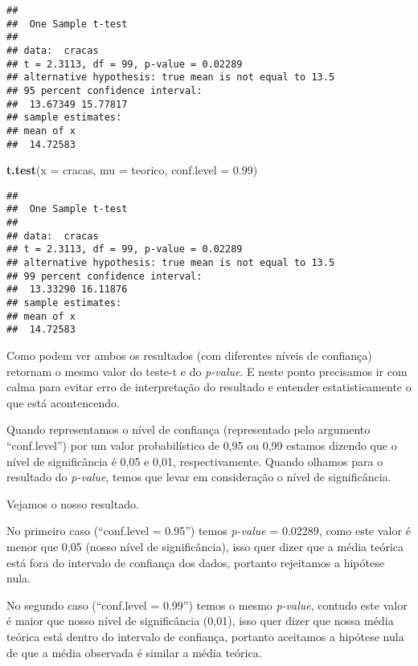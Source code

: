 \documentclass[titlepage, oneside, openany, a4paper]{book}
\newenvironment{Shaded}{\begin{snugshade}}{\end{snugshade}}
\newcommand{\DataTypeTok}[1]{\textcolor[rgb]{0.13,0.29,0.53}{#1}}
\newcommand{\FloatTok}[1]{\textcolor[rgb]{0.00,0.00,0.81}{#1}}
\newcommand{\KeywordTok}[1]{\textcolor[rgb]{0.13,0.29,0.53}{\textbf{#1}}}
\newcommand{\NormalTok}[1]{#1}
\begin{document}
\begin{verbatim}
## 
##  One Sample t-test
## 
## data:  cracas
## t = 2.3113, df = 99, p-value = 0.02289
## alternative hypothesis: true mean is not equal to 13.5
## 95 percent confidence interval:
##  13.67349 15.77817
## sample estimates:
## mean of x 
##  14.72583
\end{verbatim}

\begin{Shaded}
\begin{Highlighting}[]
\KeywordTok{t.test}\NormalTok{(}\DataTypeTok{x =}\NormalTok{ cracas, }\DataTypeTok{mu =}\NormalTok{ teorico, }\DataTypeTok{conf.level =} \FloatTok{0.99}\NormalTok{)}
\end{Highlighting}
\end{Shaded}

\begin{verbatim}
## 
##  One Sample t-test
## 
## data:  cracas
## t = 2.3113, df = 99, p-value = 0.02289
## alternative hypothesis: true mean is not equal to 13.5
## 99 percent confidence interval:
##  13.33290 16.11876
## sample estimates:
## mean of x 
##  14.72583
\end{verbatim}

Como podem ver ambos os resultados (com diferentes níveis de confiança) retornam o mesmo valor do teste-t e do \emph{p-value}. E neste ponto precisamos ir com calma para evitar erro de interpretação do resultado e entender estatisticamente o que está acontencendo.

Quando representamos o nível de confiança (representado pelo argumento ``conf.level'') por um valor probabilístico de 0,95 ou 0,99 estamos dizendo que o nível de significância é 0,05 e 0,01, respectivamente. Quando olhamos para o resultado do \emph{p-value}, temos que levar em consideração o nível de significância.

Vejamos o nosso resultado.

No primeiro caso (``conf.level = 0.95'') temos \emph{p-value} = 0.02289, como este valor é menor que 0,05 (nosso nível de significância), isso quer dizer que a média teórica está fora do intervalo de confiança dos dados, portanto rejeitamos a hipótese nula.

No segundo caso (``conf.level = 0.99'') temos o mesmo \emph{p-value}, contudo este valor é maior que nosso nível de significância (0,01), isso quer dizer que nossa média teórica está dentro do intervalo de confiança, portanto aceitamos a hipótese nula de que a média observada é similar a média teórica.
\end{document}
